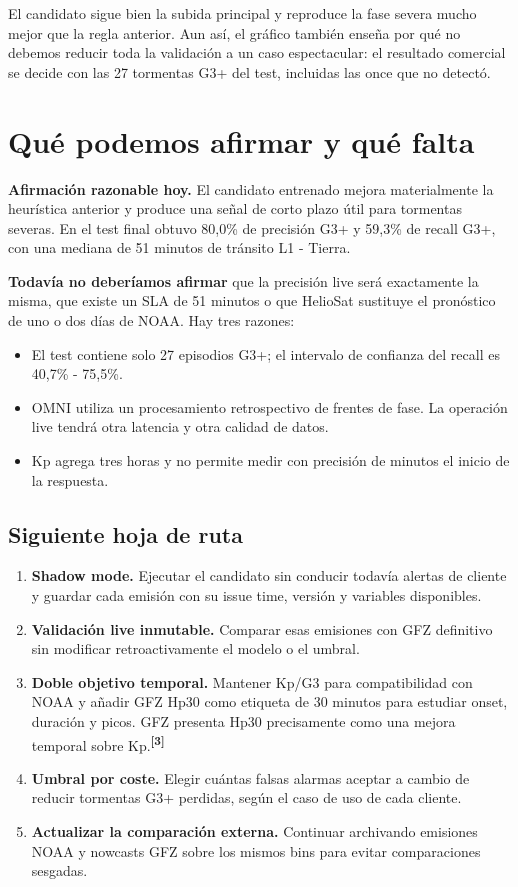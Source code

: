 \documentclass[10pt,a4paper]{article}
\let\plainsection\section
\renewcommand{\section}[1]{\plainsection{\color{Navy}#1}}
\let\plainsubsection\subsection
\renewcommand{\subsection}[1]{\plainsubsection{\color{Ink}#1}}
\newenvironment{summarybox}{\begin{center}\setlength{\fboxsep}{4mm}\begin{lrbox}{\summarysave}\begin{minipage}{0.90\textwidth}}{\end{minipage}\end{lrbox}\colorbox{CyanSoft}{\usebox{\summarysave}}\end{center}}
\newcommand{\source}[1]{\textsuperscript{\color{Cyan}\textbf{[#1]}}}
\begin{document}
El candidato sigue bien la subida principal y reproduce la fase severa mucho mejor que la regla anterior. Aun así, el gráfico también enseña por qué no debemos reducir toda la validación a un caso espectacular: el resultado comercial se decide con las 27 tormentas G3+ del test, incluidas las once que no detectó.

\section{Qué podemos afirmar y qué falta}

\begin{summarybox}
\textbf{Afirmación razonable hoy.} El candidato entrenado mejora materialmente la heurística anterior y produce una señal de corto plazo útil para tormentas severas. En el test final obtuvo 80,0\% de precisión G3+ y 59,3\% de recall G3+, con una mediana de 51 minutos de tránsito L1 - Tierra.
\end{summarybox}

\textbf{Todavía no deberíamos afirmar} que la precisión live será exactamente la misma, que existe un SLA de 51 minutos o que HelioSat sustituye el pronóstico de uno o dos días de NOAA. Hay tres razones:
\begin{itemize}
  \item El test contiene solo 27 episodios G3+; el intervalo de confianza del recall es 40,7\% - 75,5\%.
  \item OMNI utiliza un procesamiento retrospectivo de frentes de fase. La operación live tendrá otra latencia y otra calidad de datos.
  \item Kp agrega tres horas y no permite medir con precisión de minutos el inicio de la respuesta.
\end{itemize}

\subsection{Siguiente hoja de ruta}

\begin{enumerate}
  \item \textbf{Shadow mode.} Ejecutar el candidato sin conducir todavía alertas de cliente y guardar cada emisión con su issue time, versión y variables disponibles.
  \item \textbf{Validación live inmutable.} Comparar esas emisiones con GFZ definitivo sin modificar retroactivamente el modelo o el umbral.
  \item \textbf{Doble objetivo temporal.} Mantener Kp/G3 para compatibilidad con NOAA y añadir GFZ Hp30 como etiqueta de 30 minutos para estudiar onset, duración y picos. GFZ presenta Hp30 precisamente como una mejora temporal sobre Kp.\source{3}
  \item \textbf{Umbral por coste.} Elegir cuántas falsas alarmas aceptar a cambio de reducir tormentas G3+ perdidas, según el caso de uso de cada cliente.
  \item \textbf{Actualizar la comparación externa.} Continuar archivando emisiones NOAA y nowcasts GFZ sobre los mismos bins para evitar comparaciones sesgadas.
\end{enumerate}
\end{document}
